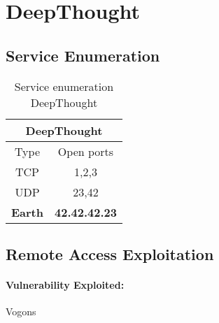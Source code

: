 \renewcommand{\hostname}{DeepThought}
\renewcommand{\os}{Earth}
\renewcommand{\ip}{42.42.42.23}
\renewcommand{\tcpports}{1,2,3}
\renewcommand{\udpports}{23,42}
\renewcommand{\vuln}{Vogons}
\def\root{}   %


\section{\hostname}
\subsection{Service Enumeration}

\begin{table}[h]
	\begin{tabular}{|c|c|}
		\hline
		\multicolumn{2}{|c|}{\textbf{\hostname}}\\\hline\hline
		Type         & Open ports   \\\hline
		TCP          & \tcpports{}  \\\hline
		UDP          & \udpports{}  \\\hline\hline
		\textbf{\os} & \textbf{\ip} \\\hline
	\end{tabular}
	\caption{Service enumeration \hostname}
\end{table}

\subsection{Remote Access Exploitation}

\paragraph{Vulnerability Exploited:}
\vuln


